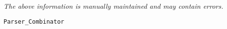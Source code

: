 \label{pkg:parser\_combinator}

{\tiny \it The above information is manually maintained and may contain errors.}
\begin{verbatim}
Parser_Combinator
\end{verbatim}
